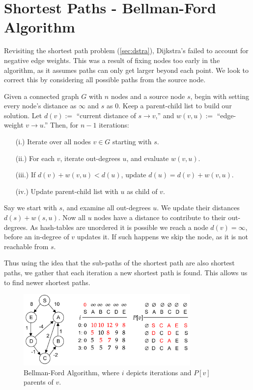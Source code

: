 \section{Shortest Paths - Bellman-Ford Algorithm}
Revisiting the shortest path problem (\ref{sec:dstra}), Dijkstra's failed to 
account for negative edge weights. This was a result of fixing nodes too early in the algorithm,
as it assumes paths can only get larger beyond each point. We look to correct this by considering all possible paths from the source node.
\begin{theo}

    Given a connected graph $G$ with $n$ nodes and a source node $s$, begin with setting 
    every node's distance as $\infty$ and $s$ as 0. Keep a parent-child list to build our solution. Let $d(v):=$ ``current distance of $s\to v$,'' and 
    $w(v,u):=$ ``edge-weight $v\to u$.'' Then, for $n-1$ iterations:
    \begin{enumerate}
        \item [(i.)] Iterate over all nodes $v\in G$ starting with $s$.
        \item [(ii.)] For each $v$, iterate out-degrees $u$, and evaluate $w(v,u)$.
        \item [(iii.)] If $d(v)+w(v,u)<d(u)$, update $d(u)=d(v)+w(v,u)$.
        \item [(iv.)] Update parent-child list with $u$ as child of $v$.
    \end{enumerate}
\end{theo}
\noindent
Say we start with $s$, and examine all out-degrees $u$. We update their distances $d(s)+w(s,u)$. Now all $u$ nodes 
have a distance to contribute to their out-degrees. As hash-tables are unordered it is possible we reach a node $d(v)=\infty$, 
before an in-degree of $v$ updates it. If such happens we skip the node, as it is not reachable from $s$.

\newpage
\noindent
Thus using the idea that the sub-paths of the shortest path are also shortest paths, we gather that
each iteration a new shortest path is found. This allows us to find newer shortest paths.
\begin{figure}[h]
    \centering
    \includegraphics[width=0.8\textwidth]{Sections/dp/bford.png}
    \caption{Bellman-Ford Algorithm, where $i$ depicts iterations and $P[v]$ parents of $v$.}
    \label{fig:bford}
\end{figure}

